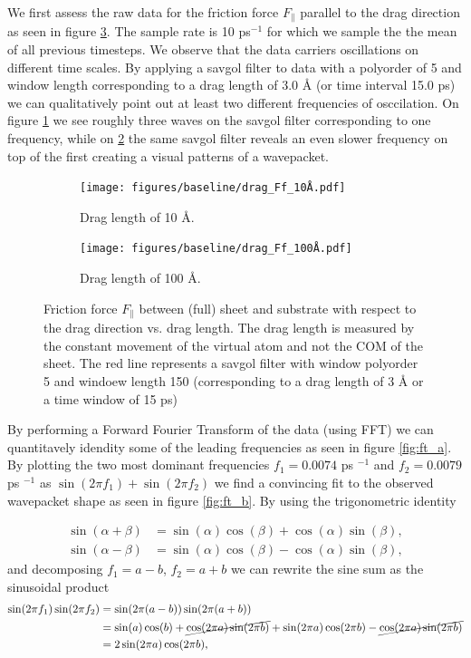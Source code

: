 We first assess the raw data for the friction force $F_{\parallel}$ parallel to the drag direction as seen in figure \ref{fig:drag_Ff}. The sample rate is 10 ps$^{-1}$ for which we sample the the mean of all previous timesteps. We observe that the data carriers oscillations on different time scales. By applying a savgol filter to data with a polyorder of 5 and window length corresponding to a drag length of 3.0 Å (or time interval 15.0 ps) we can qualitatively point out at least two different frequencies of osccilation. On figure \ref{fig:drag_Ff_10} we see roughly three waves on the savgol filter corresponding to one frequency, while on \ref{fig:drag_Ff_100} the same savgol filter reveals an even slower frequency on top of the first creating a visual patterns of a wavepacket.

\begin{figure}[H]
  \centering
  \begin{subfigure}[b]{0.49\textwidth}
      \centering
      \texttt{[image: figures/baseline/drag\_Ff\_10Å.pdf]}
      \caption{Drag length of 10 Å.}
      \label{fig:drag_Ff_10}
  \end{subfigure}
  \hfill
  \begin{subfigure}[b]{0.49\textwidth}
      \centering
      \texttt{[image: figures/baseline/drag\_Ff\_100Å.pdf]}
      \caption{Drag length of 100 Å.}
      \label{fig:drag_Ff_100}
  \end{subfigure}
  \hfill
     \caption{Friction force $F_\parallel$ between (full) sheet and substrate with respect to the drag direction vs. drag length. The drag length is measured by the constant movement of the virtual atom and not the COM of the sheet. The red line represents a savgol filter with window polyorder 5 and windoew length 150 (corresponding to a drag length of 3 Å or a time window of 15 ps)}
     \label{fig:drag_Ff}
\end{figure}

By performing a Forward Fourier Transform of the data (using FFT) we can quantitavely idendity some of the leading frequencies as seen in figure \ref{fig:ft_a}. By plotting the two most dominant frequencies $f_1 = 0.0074$ ps $^{-1}$ and $f_2 = 0.0079$ ps $^{-1}$ as $\sin{(2\pi f_1)} + \sin{(2\pi f_2)}$ we find a convincing fit to the observed wavepacket shape as seen in figure \ref{fig:ft_b}. By using the trigonometric identity

\begin{align*}
\sin (\alpha+\beta) &= \sin (\alpha) \cos (\beta) + \cos (\alpha) \sin (\beta), \\
\sin (\alpha-\beta) &= \sin (\alpha) \cos (\beta) - \cos (\alpha) \sin (\beta),
\end{align*}
and decomposing $f_1 = a - b$, $f_2 = a + b$ we can rewrite the sine sum as the sinusoidal product
\begin{align*}
  \sin(2\pi f_1) \sin(2\pi f_2) &= \sin(2\pi (a - b)) \sin(2\pi (a + b)) \\
  &= \sin(a)\cos(b) + \cancel{\cos(2\pi a)\sin(2\pi b)} + \sin(2\pi a)\cos(2\pi b) - \cancel{\cos(2\pi a)\sin(2\pi b)} \\
  &= 2 \sin(2\pi a) \cos(2\pi b),
\end{align*} 

